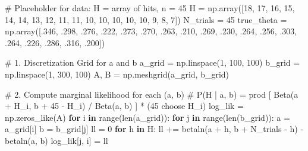 \documentclass[
  letterpaper,
  DIV=11,
  numbers=noendperiod]{scrartcl}
\newenvironment{Shaded}{\begin{snugshade}}{\end{snugshade}}
\newcommand{\BuiltInTok}[1]{\textcolor[rgb]{0.00,0.23,0.31}{#1}}
\newcommand{\CommentTok}[1]{\textcolor[rgb]{0.37,0.37,0.37}{#1}}
\newcommand{\ControlFlowTok}[1]{\textcolor[rgb]{0.00,0.23,0.31}{\textbf{#1}}}
\newcommand{\DecValTok}[1]{\textcolor[rgb]{0.68,0.00,0.00}{#1}}
\newcommand{\FloatTok}[1]{\textcolor[rgb]{0.68,0.00,0.00}{#1}}
\newcommand{\KeywordTok}[1]{\textcolor[rgb]{0.00,0.23,0.31}{\textbf{#1}}}
\newcommand{\NormalTok}[1]{\textcolor[rgb]{0.00,0.23,0.31}{#1}}
\newcommand{\OperatorTok}[1]{\textcolor[rgb]{0.37,0.37,0.37}{#1}}
\begin{document}
\begin{Shaded}
\begin{Highlighting}[]
\CommentTok{\# Placeholder for data: H = array of hits, n = 45}
\NormalTok{H }\OperatorTok{=}\NormalTok{ np.array([}\DecValTok{18}\NormalTok{, }\DecValTok{17}\NormalTok{, }\DecValTok{16}\NormalTok{, }\DecValTok{15}\NormalTok{, }\DecValTok{14}\NormalTok{, }\DecValTok{14}\NormalTok{, }\DecValTok{13}\NormalTok{, }\DecValTok{12}\NormalTok{, }\DecValTok{11}\NormalTok{, }\DecValTok{11}\NormalTok{, }\DecValTok{10}\NormalTok{, }\DecValTok{10}\NormalTok{, }\DecValTok{10}\NormalTok{, }\DecValTok{10}\NormalTok{, }\DecValTok{10}\NormalTok{, }\DecValTok{9}\NormalTok{, }\DecValTok{8}\NormalTok{, }\DecValTok{7}\NormalTok{])}
\NormalTok{N\_trials }\OperatorTok{=} \DecValTok{45}
\NormalTok{true\_theta }\OperatorTok{=}\NormalTok{ np.array([}\FloatTok{.346}\NormalTok{, }\FloatTok{.298}\NormalTok{, }\FloatTok{.276}\NormalTok{, }\FloatTok{.222}\NormalTok{, }\FloatTok{.273}\NormalTok{, }\FloatTok{.270}\NormalTok{, }\FloatTok{.263}\NormalTok{, }\FloatTok{.210}\NormalTok{, }\FloatTok{.269}\NormalTok{, }\FloatTok{.230}\NormalTok{, }\FloatTok{.264}\NormalTok{, }\FloatTok{.256}\NormalTok{, }\FloatTok{.303}\NormalTok{, }\FloatTok{.264}\NormalTok{, }\FloatTok{.226}\NormalTok{, }\FloatTok{.286}\NormalTok{, }\FloatTok{.316}\NormalTok{, }\FloatTok{.200}\NormalTok{])}

\CommentTok{\# 1. Discretization Grid for a and b}
\NormalTok{a\_grid }\OperatorTok{=}\NormalTok{ np.linspace(}\DecValTok{1}\NormalTok{, }\DecValTok{100}\NormalTok{, }\DecValTok{100}\NormalTok{)}
\NormalTok{b\_grid }\OperatorTok{=}\NormalTok{ np.linspace(}\DecValTok{1}\NormalTok{, }\DecValTok{300}\NormalTok{, }\DecValTok{100}\NormalTok{)}
\NormalTok{A, B }\OperatorTok{=}\NormalTok{ np.meshgrid(a\_grid, b\_grid)}

\CommentTok{\# 2. Compute marginal likelihood for each (a, b)}
\CommentTok{\# P(H | a, b) = prod [ Beta(a + H\_i, b + 45 {-} H\_i) / Beta(a, b) ] * (45 choose H\_i)}
\NormalTok{log\_lik }\OperatorTok{=}\NormalTok{ np.zeros\_like(A)}
\ControlFlowTok{for}\NormalTok{ i }\KeywordTok{in} \BuiltInTok{range}\NormalTok{(}\BuiltInTok{len}\NormalTok{(a\_grid)):}
    \ControlFlowTok{for}\NormalTok{ j }\KeywordTok{in} \BuiltInTok{range}\NormalTok{(}\BuiltInTok{len}\NormalTok{(b\_grid)):}
\NormalTok{        a }\OperatorTok{=}\NormalTok{ a\_grid[i]}
\NormalTok{        b }\OperatorTok{=}\NormalTok{ b\_grid[j]}
\NormalTok{        ll }\OperatorTok{=} \DecValTok{0}
        \ControlFlowTok{for}\NormalTok{ h }\KeywordTok{in}\NormalTok{ H:}
\NormalTok{            ll }\OperatorTok{+=}\NormalTok{ betaln(a }\OperatorTok{+}\NormalTok{ h, b }\OperatorTok{+}\NormalTok{ N\_trials }\OperatorTok{{-}}\NormalTok{ h) }\OperatorTok{{-}}\NormalTok{ betaln(a, b)}
\NormalTok{        log\_lik[j, i] }\OperatorTok{=}\NormalTok{ ll}


\end{Highlighting}
\end{Shaded}
\end{document}
